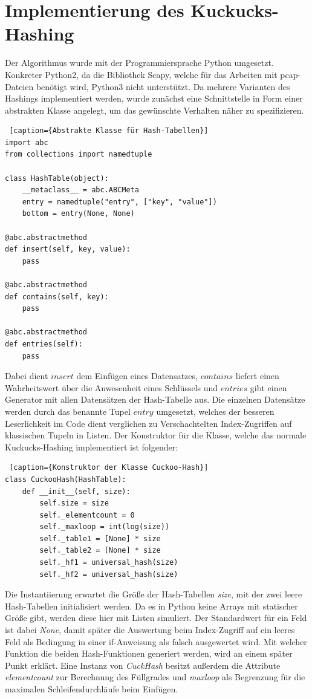 \section{Implementierung des Kuckucks-Hashing}
Der Algorithmus wurde mit der Programmiersprache Python umgesetzt. Konkreter Python2, da die Bibliothek Scapy, welche für das Arbeiten mit pcap-Dateien benötigt wird, Python3 nicht unterstützt. Da mehrere Varianten des Hashings implementiert werden, wurde zunächst eine Schnittstelle in Form einer abstrakten Klasse angelegt, um das gewünschte Verhalten näher zu spezifizieren.
\newpage
\begin{lstlisting} [caption={Abstrakte Klasse für Hash-Tabellen}]
import abc
from collections import namedtuple

class HashTable(object):
    __metaclass__ = abc.ABCMeta
    entry = namedtuple("entry", ["key", "value"])
    bottom = entry(None, None)

@abc.abstractmethod
def insert(self, key, value):
    pass

@abc.abstractmethod
def contains(self, key):
    pass

@abc.abstractmethod
def entries(self):
    pass
\end{lstlisting}
Dabei dient \(insert\) dem Einfügen eines Datensatzes, \(contains\) liefert einen Wahrheitswert über die Anwesenheit eines Schlüssels und \(entries\) gibt einen Generator mit allen Datensätzen der Hash-Tabelle aus. Die einzelnen Datensätze werden durch das benannte Tupel \(entry\) umgesetzt, welches der besseren Leserlichkeit im Code dient verglichen zu Verschachtelten Index-Zugriffen auf klassischen Tupeln in Listen.
\newpage
Der Konstruktor für die Klasse, welche das normale Kuckucks-Hashing implementiert ist folgender:
\begin{lstlisting} [caption={Konstruktor der Klasse Cuckoo-Hash}]
class CuckooHash(HashTable):
    def __init__(self, size):
        self.size = size
        self._elementcount = 0
        self._maxloop = int(log(size))
        self._table1 = [None] * size
        self._table2 = [None] * size
        self._hf1 = universal_hash(size)
        self._hf2 = universal_hash(size)
\end{lstlisting}
Die Instantiierung erwartet die Größe der Hash-Tabellen \textit{size}, mit der zwei leere Hash-Tabellen initialisiert werden. Da es in Python keine Arrays mit statischer Größe gibt, werden diese hier mit Listen simuliert. Der Standardwert für ein Feld ist dabei \textit{None}, damit später die Auswertung beim Index-Zugriff auf ein leeres Feld als Bedingung in einer if-Anweisung als falsch ausgewertet wird. Mit welcher Funktion die beiden Hash-Funktionen generiert werden, wird an einem später Punkt erklärt. Eine Instanz von \textit{CuckHash} besitzt außerdem die Attribute \textit{elementcount} zur Berechnung des Füllgrades und \textit{maxloop} als Begrenzung für die maximalen Schleifendurchläufe beim Einfügen.


